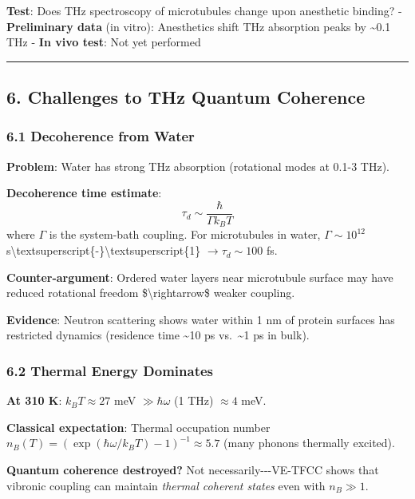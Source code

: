\textbf{Test}: Does THz spectroscopy of microtubules change upon
anesthetic binding? - \textbf{Preliminary data} (in vitro): Anesthetics
shift THz absorption peaks by \textasciitilde0.1 THz - \textbf{In vivo
test}: Not yet performed

\begin{center}\rule{0.5\linewidth}{0.5pt}\end{center}

\subsection{6. Challenges to THz Quantum
Coherence}\label{challenges-to-thz-quantum-coherence}

\subsubsection{6.1 Decoherence from Water}\label{decoherence-from-water}

\textbf{Problem}: Water has strong THz absorption (rotational modes at
0.1-3 THz).

\textbf{Decoherence time estimate}:
\[\tau_d \sim \frac{\hbar}{\Gamma k_B T}\] where \(\Gamma\) is the
system-bath coupling. For microtubules in water, \(\Gamma \sim 10^{12}\)
s\textbackslash textsuperscript\{-\}\textbackslash textsuperscript\{1\}
\(\rightarrow \tau_d \sim 100\) fs.

\textbf{Counter-argument}: Ordered water layers near microtubule surface
may have reduced rotational freedom \$\textbackslash rightarrow\$ weaker
coupling.

\textbf{Evidence}: Neutron scattering shows water within 1 nm of protein
surfaces has restricted dynamics (residence time \textasciitilde10 ps
vs.~\textasciitilde1 ps in bulk).

\subsubsection{6.2 Thermal Energy
Dominates}\label{thermal-energy-dominates}

\textbf{At 310 K}: \(k_B T \approx 27\) meV \(\gg \hbar \omega\) (1 THz)
\(\approx 4\) meV.

\textbf{Classical expectation}: Thermal occupation number
\(n_B(T) = (\exp(\hbar \omega / k_B T) - 1)^{-1} \approx 5.7\) (many
phonons thermally excited).

\textbf{Quantum coherence destroyed?} Not necessarily-\/-\/-VE-TFCC
shows that vibronic coupling can maintain \emph{thermal coherent states}
even with \(n_B \gg 1\).

